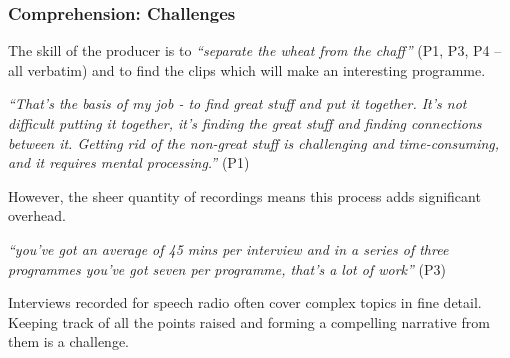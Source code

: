 


\subsubsection{Comprehension: Challenges}

The skill of the producer is to \textit{``separate the wheat from the chaff''} (P1, P3, P4 -- all verbatim) and to find
the clips which will make an interesting programme.

\textit{``That's the basis of my job - to find great stuff and put it together.
  It's not difficult putting it together, it's finding the great stuff and finding connections between it. Getting rid
  of the non-great stuff is
  challenging and time-consuming, and it requires mental processing.''} (P1)

However, the sheer quantity of recordings means this process adds significant overhead.

\textit{``you've got an average of 45 mins per interview and in a series of
  three programmes you've got seven per programme, that's a lot of work''} (P3)

Interviews recorded for speech radio often cover complex topics in fine
detail. Keeping track of all the points raised and forming a compelling
narrative from them is a challenge.

